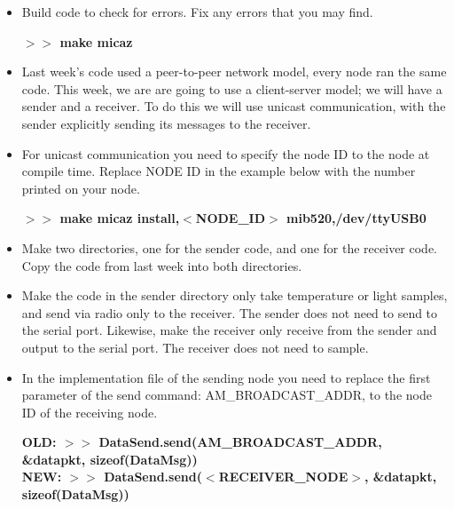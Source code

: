 \documentclass [a4] {article}
\begin{document}
\begin{itemize}
\item Build code to check for errors. Fix any errors that you may find.

\textbf{$>>$ make micaz} \\


\item Last week's code used a peer-to-peer network model, every node ran the same code. This week, we are are going to use a client-server model; we will have a sender and a receiver. To do this we will use unicast communication, with the sender explicitly sending its messages to the receiver.

\item For unicast communication you need to specify the node ID to the node at compile time. Replace NODE ID in the example below with the number printed on your node.

\textbf{$>>$ make micaz install,$<$NODE\_ID$>$ mib520,/dev/ttyUSB0} \\


\item Make two directories, one for the sender code, and one for the receiver code. Copy the code from last week into both directories.

\item Make the code in the sender directory only take temperature or light samples, and send via radio only to the receiver. The sender does not need to send to the serial port. Likewise, make the receiver only receive from the sender and output to the serial port. The receiver does not need to sample.

\item In the implementation file of the sending node you need to replace the first parameter of the send command: AM\_BROADCAST\_ADDR, to the node ID of the receiving node.

\textbf{OLD: $>>$ DataSend.send(AM\_BROADCAST\_ADDR, \&datapkt, sizeof(DataMsg))} \\
\textbf{NEW: $>>$ DataSend.send($<$RECEIVER\_NODE$>$, \&datapkt, sizeof(DataMsg))} \\


\end{itemize}
\end{document}
